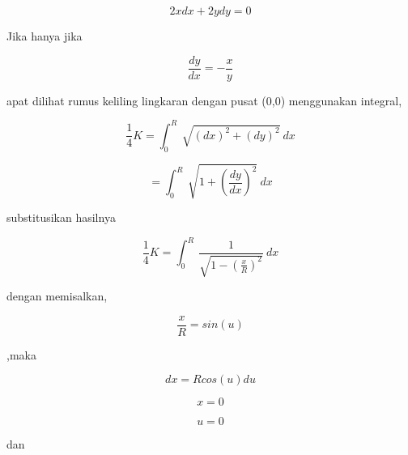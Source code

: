 \documentclass{article}
\begin{document}
\begin{eulernotebook}
\begin{eulercomment}
\begin{eulercomment}
\begin{eulercomment}
\begin{eulercomment}
\begin{eulercomment}
\end{eulercomment}
\begin{eulerformula}
\[
2x dx + 2y dy = 0
\]
\end{eulerformula}
\begin{eulercomment}
Jika hanya jika


\end{eulercomment}
\begin{eulerformula}
\[
\frac{dy}{dx} = - \frac{x}{y}
\]
\end{eulerformula}
\begin{eulercomment}
apat dilihat rumus keliling lingkaran dengan pusat (0,0) menggunakan
integral,



\end{eulercomment}
\begin{eulerformula}
\[
\frac{1}{4} K = \int_{0}^{R} \ \sqrt{(dx)^2+(dy)^2} \ dx
\]
\end{eulerformula}
\begin{eulercomment}
\end{eulercomment}
\begin{eulerformula}
\[
= \int_{0}^{R} \ \sqrt{1+(\frac{dy}{dx})^2} \ dx
\]
\end{eulerformula}
\begin{eulercomment}
substitusikan hasilnya



\end{eulercomment}
\begin{eulerformula}
\[
\frac{1}{4} K = \int_{0}^{R} \ \frac{1}{\sqrt{1-(\frac{x}{R})^2}} \ dx
\]
\end{eulerformula}
\begin{eulercomment}
dengan memisalkan,



\end{eulercomment}
\begin{eulerformula}
\[
\frac{x}{R} = sin(u)
\]
\end{eulerformula}
\begin{eulercomment}
,maka


\end{eulercomment}
\begin{eulerformula}
\[
dx=R cos(u) du
\]
\end{eulerformula}
\begin{eulercomment}
\end{eulercomment}
\begin{eulerformula}
\[
x=0
\]
\end{eulerformula}
\begin{eulerformula}
\[
u=0
\]
\end{eulerformula}
\begin{eulercomment}
dan


\end{eulercomment}
\end{eulercomment}
\end{eulercomment}
\end{eulercomment}
\end{eulercomment}
\end{eulernotebook}
\end{document}
